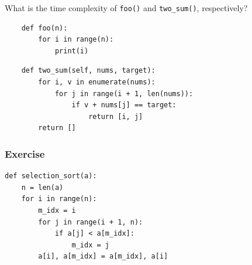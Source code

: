 \documentclass[aspectratio=169, 14pt]{beamer}
\begin{document}
\begin{frame}[fragile]
    
    {\large {}} What is the time complexity of \texttt{foo()} and \texttt{two\_sum()}, respectively? 
    \begin{verbatim}
    def foo(n):
        for i in range(n):
            print(i)
    \end{verbatim}

    \begin{verbatim}
    def two_sum(self, nums, target):
        for i, v in enumerate(nums):
            for j in range(i + 1, len(nums)):
                if v + nums[j] == target:
                    return [i, j]
        return []
    \end{verbatim}
\end{frame}

\begin{frame}[fragile]
    \frametitle{Exercise}
\begin{verbatim}
def selection_sort(a):
    n = len(a)
    for i in range(n):
        m_idx = i
        for j in range(i + 1, n):
            if a[j] < a[m_idx]:
                m_idx = j
        a[i], a[m_idx] = a[m_idx], a[i]    
\end{verbatim}
\end{frame}
\end{document}
